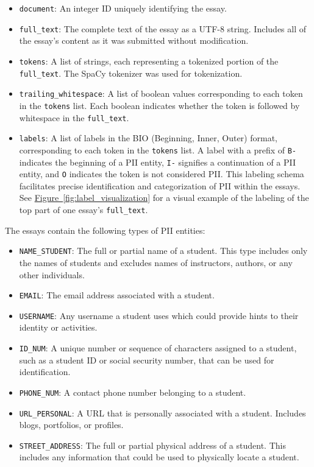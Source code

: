 \documentclass[11pt]{article}
\newcommand{\Figlink}[1]{\hyperref[#1]{Figure~\ref*{#1}}}
\begin{document}
\begin{itemize}
  \label{par:pii_types}
  \item \texttt{document}: An integer ID uniquely identifying the essay.
  \item \texttt{full\_text}: The complete text of the essay as a UTF-8 string. Includes all of the essay's content as it was submitted without modification.
  \item \texttt{tokens}: A list of strings, each representing a tokenized portion of the \texttt{full\_text}. The SpaCy tokenizer \cite{honnibal2020spacy} was used for tokenization.
  \item \texttt{trailing\_whitespace}: A list of boolean values corresponding to each token in the \texttt{tokens} list. Each boolean indicates whether the token is followed by whitespace in the \texttt{full\_text}.
  \item \texttt{labels}: A list of labels in the BIO (Beginning, Inner, Outer) format, corresponding to each token in the \texttt{tokens} list. A label with a prefix of \texttt{B-} indicates the beginning of a PII entity, \texttt{I-} signifies a continuation of a PII entity, and \texttt{O} indicates the token is not considered PII. This labeling schema facilitates precise identification and categorization of PII within the essays. See \Figlink{fig:label_visualization} for a visual example of the labeling of the top part of one essay's \texttt{full\_text}. 
\end{itemize}

The essays contain the following types of PII entities:

\begin{itemize}
  \item \texttt{NAME\_STUDENT}: The full or partial name of a student. This type includes only the names of students and excludes names of instructors, authors, or any other individuals.
  \item \texttt{EMAIL}: The email address associated with a student.
  \item \texttt{USERNAME}: Any username a student uses which could provide hints to their identity or activities.
  \item \texttt{ID\_NUM}: A unique number or sequence of characters assigned to a student, such as a student ID or social security number, that can be used for identification.
  \item \texttt{PHONE\_NUM}: A contact phone number belonging to a student.
  \item \texttt{URL\_PERSONAL}: A URL that is personally associated with a student. Includes blogs, portfolios, or profiles.
  \item \texttt{STREET\_ADDRESS}: The full or partial physical address of a student. This includes any information that could be used to physically locate a student.
\end{itemize}
\end{document}
